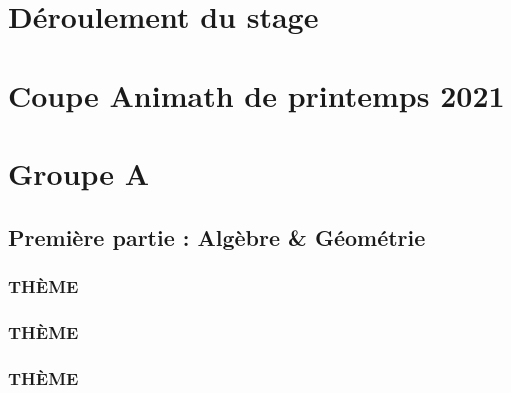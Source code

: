 \documentclass[poly,trombi]{valbonne}
\begin{document}

\pagestyle{plain}

\footnotesize
\pagestyle{trombi}
\newpage


\normalsize


\pagestyle{empty}

\renewcommand{\headrulewidth}{0.4pt}

\tableofcontents

\chapter{Déroulement du stage}
\pagestyle {plain}



\chapter{Coupe Animath de printemps 2021}


\chapter{Groupe A}

\minitoc \clearpage

\section{Première partie : Algèbre \& Géométrie}

\subsection{THÈME}


\subsection{THÈME}


\subsection{THÈME}
\end{document}
